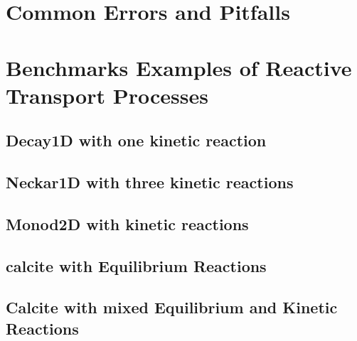 \section{Common Errors and Pitfalls}



\section{Benchmarks Examples of Reactive Transport Processes}

\subsection{Decay1D with one kinetic reaction}

\subsection{Neckar1D with three kinetic reactions}

\subsection{Monod2D with kinetic reactions}

\subsection{calcite with Equilibrium Reactions}

\subsection{Calcite with mixed Equilibrium and Kinetic Reactions}